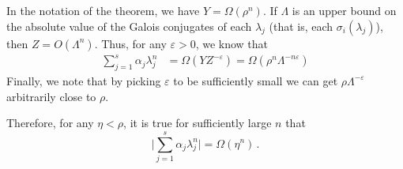 In the notation of the theorem, we have $Y=\Omega(\rho^n)$. If $\Lambda$ is an upper bound on the absolute value of the Galois conjugates of each $\lambda_j$ (that is, each $\sigma_i(\lambda_j)$), then $Z=O(\Lambda^n)$. Thus, for any $\varepsilon>0$, we know that
\begin{align*}
\sum\limits_{j=1}^s\alpha_j\lambda_j^n &=\Omega(YZ^{-\varepsilon})=
\Omega\left(\rho^n\Lambda^{-n\varepsilon}\right)
\end{align*}
Finally, we note that by picking $\varepsilon$ to be sufficiently small we can get $\rho\Lambda^{-\varepsilon}$ arbitrarily close to $\rho$.

Therefore, for any $\eta < \rho$, it is true for sufficiently large $n$ that
\begin{equation*}
  \bigg\lvert \sum \limits_{j=1}^{s} \alpha_{j} \lambda_{j}^{n} \bigg\lvert = \Omega(\eta^{n}) \, .
\end{equation*}
